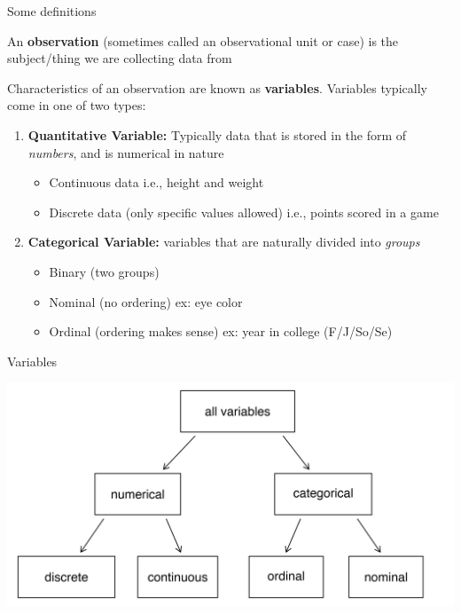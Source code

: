 \documentclass{beamer}
\begin{document}



\begin{frame}{Some definitions}

An \textbf{observation} (sometimes called an observational unit or case) is the subject/thing we are collecting data from \vspace{4mm}

Characteristics of an observation are known as \textbf{variables}. Variables typically come in one of two types: \vspace{4mm}

\begin{enumerate}
\item \textbf{Quantitative Variable:} Typically data that is stored in the form of \textit{numbers}, and is numerical in nature
\begin{itemize}
\item Continuous data i.e., height and weight
\item Discrete data (only specific values allowed) i.e., points scored in a game
\end{itemize} \vspace{2mm}
\item \textbf{Categorical Variable:} variables that are naturally divided into \textit{groups} \vspace{-2mm}
\begin{itemize}
\item Binary (two groups)
\item Nominal (no ordering) ex: eye color
\item Ordinal (ordering makes sense) ex: year in college (F/J/So/Se)
\end{itemize}
\end{enumerate}
\end{frame}

\begin{frame}{Variables}
\begin{center}
\includegraphics[scale=0.6]{img/data_vars.png}
\end{center}
\end{frame}
\end{document}
